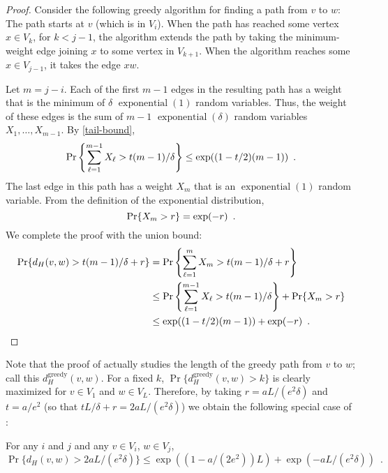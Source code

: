 \documentclass[lotsofwhite]{patmorin}
\DeclareMathOperator{\exponential}{exponential}
\begin{document}
\begin{proof}
   Consider the following greedy algorithm for finding a path from $v$
   to $w$: The path starts at $v$ (which is in $V_i$).  When the path
   has reached some vertex $x\in V_{k}$, for $k<j-1$, the algorithm
   extends the path by taking the minimum-weight edge joining $x$ to some
   vertex in $V_{k+1}$.  When the algorithm reaches some $x\in V_{j-1}$,
   it takes the edge $xw$.

   Let $m=j-i$.  Each of the first $m-1$ edges in the resulting path
   has a weight that is the minimum of $\delta$ $\exponential(1)$
   random variables.  Thus, the weight of these edges is the sum of
   $m-1$ $\exponential(\delta)$ random variables $X_1,\ldots,X_{m-1}$.
   By \eqref{tail-bound},
   \begin{equation}
     \Pr\left\{\sum_{\ell=1}^{m-1} X_\ell > t(m-1)/\delta \right\} \le 
        \exp((1-t/2)(m-1)) \enspace .  \eqlabel{part-i}
   \end{equation}
   The last edge in this path has a weight $X_m$ that is an
   $\exponential(1)$ random variable.  From the definition
   of the exponential distribution,
   \begin{equation}
      \Pr\{X_m > r\} = \exp(-r) \enspace . \eqlabel{part-ii}
   \end{equation}
   We complete the proof with the union bound:
   \begin{align*}
      \Pr\{d_H(v,w) > t(m-1)/\delta + r\} &
        = \Pr\left\{\sum_{\ell=1}^m X_m > t(m-1)/\delta + r\right\} \\
        & \le \Pr\left\{\sum_{\ell=1}^{m-1} X_\ell > t(m-1)/\delta\right\}
          + \Pr\{X_m>r\} \\
        & \le \exp((1-t/2)(m-1)) + \exp(-r) \enspace . \qedhere
   \end{align*}
\end{proof}

Note that the proof of  actually studies the length of
the greedy path from $v$ to $w$; call this $d_H^{\mathrm{greedy}}(v,w)$.
For a fixed $k$, $\Pr\{d_H^{\mathrm{greedy}}(v,w) > k\}$ is clearly
maximized for $v\in V_1$ and $w\in V_L$. Therefore, by taking
$r=aL/(e^2\delta)$ and $t=a/e^2$ (so that $tL/\delta+r = 2aL/(e^2\delta)$)
we obtain the following special case of :

\begin{cor}
  For any $i$ and $j$ and any $v\in V_i$, $w\in V_j$, 
  \[
    \Pr\{d_H(v,w) > 2aL/(e^2\delta)\} 
        \le \exp((1-a/(2e^2))L) + \exp(-aL/(e^2\delta)) \enspace . 
  \]
\end{cor}
\end{document}
